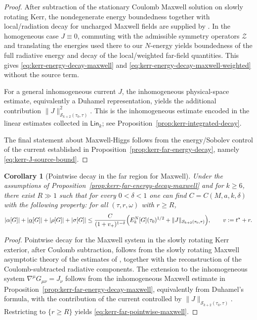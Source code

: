 \documentclass[11pt]{article}
\numberwithin{equation}{section}
\theoremstyle{plain}
\newtheorem{corollary}[theorem]{Corollary}
\theoremstyle{definition}
\theoremstyle{remark}
\newcommand{\Lin}{\mathsf{Lin}}
\begin{document}
\begin{proof}
After subtraction of the stationary Coulomb Maxwell solution on slowly rotating Kerr, the nondegenerate energy boundedness together with local/radiation decay for uncharged Maxwell fields are supplied by \cite{AnderssonBlueMaxwellSlowKerr}.
In the homogeneous case $J\equiv0$, commuting with the admissible symmetry operators $\mathcal Z$ and translating the energies used there to our $N$-energy yields boundedness of the full radiative energy and decay of the local/weighted far-field quantities. This gives \eqref{eq:kerr-energy-decay-maxwell} and \eqref{eq:kerr-energy-decay-maxwell-weighted} without the source term.

For a general inhomogeneous current $J$, the inhomogeneous physical-space estimate, equivalently a Duhamel representation, yields the additional contribution $\|J\|_{\mathcal S_{k+2}(\tau_{0},\tau)}^{2}$.
This is the inhomogeneous estimate encoded in the linear estimates collected in $\Lin_{k}$; see Proposition~\ref{prop:kerr-integrated-decay}.

The final statement about Maxwell-Higgs follows from the energy/Sobolev control of the current established in Proposition~\ref{prop:kerr-far-energy-decay}, namely \eqref{eq:kerr-J-source-bound}.
\end{proof}

\begin{corollary}[Pointwise decay in the far region for Maxwell]\label{cor:kerr-far-pointwise-maxwell}
Under the assumptions of Proposition~\ref{prop:kerr-far-energy-decay-maxwell} and for $k\ge 6$, there exist $R\gg1$ such that for every $0<\delta<1$ one can find $C=C(M,a,k,\delta)$ with the following property: for all $(\tau,r,\omega)$ with $r\ge R$,
\begin{equation}\label{eq:kerr-far-pointwise-maxwell}
|\alpha[G]|+|\underline{\alpha}[G]|+|\rho[G]|+|\sigma[G]|
\le
\frac{C}{(1+v_{+})^{1-\delta}}
\Bigl(
E^{N}_{k}[G](\tau_{0})^{1/2}
+
\|J\|_{\mathcal S_{k+2}(\tau_{0},\tau)}
\Bigr),
\qquad
v:=t^{\star}+r.
\end{equation}
\end{corollary}

\begin{proof}
Pointwise decay for the Maxwell system in the slowly rotating Kerr exterior, after Coulomb subtraction, follows from the slowly rotating Maxwell asymptotic theory of the estimates of \cite{AnderssonBlueMaxwellSlowKerr}, together with the reconstruction of the Coulomb-subtracted radiative components.
The extension to the inhomogeneous system $\nabla^{\mu}G_{\mu\nu}=J_{\nu}$ follows from the inhomogeneous Maxwell estimate in Proposition~\ref{prop:kerr-far-energy-decay-maxwell}, equivalently from Duhamel's formula, with the contribution of the current controlled by $\|J\|_{\mathcal S_{k+2}(\tau_{0},\tau)}$.
Restricting to $\{r\ge R\}$ yields \eqref{eq:kerr-far-pointwise-maxwell}.
\end{proof}
\end{document}
